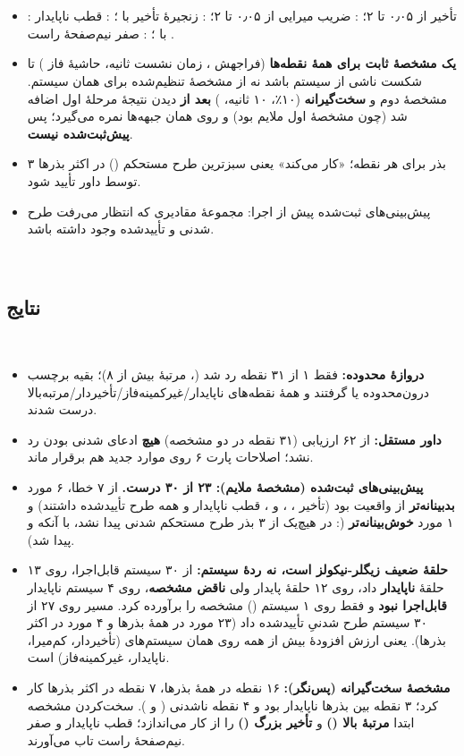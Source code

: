 ‫\documentclass[a4paper,12pt]{article}
\begin{document}
‫\begin{itemize}
‫\item {}: تأخیر \lr{$\theta/\tau$} از ۰٫۰۵ تا ۲؛ : ضریب میرایی \lr{$\zeta$} از ۰٫۰۵ تا ۲؛ : زنجیرهٔ تأخیر  با ؛ : قطب ناپایدار  با ؛ : صفر نیم‌صفحهٔ راست .
‫\item \textbf{یک مشخصهٔ ثابت برای همهٔ نقطه‌ها} (فراجهش ، زمان نشست  ثانیه، حاشیهٔ فاز ) تا شکست ناشی از سیستم باشد نه از مشخصهٔ تنظیم‌شده برای همان سیستم. مشخصهٔ دوم و \textbf{سخت‌گیرانه} (۱۰٪، ۱۰ ثانیه، ) \textbf{بعد از} دیدن نتیجهٔ مرحلهٔ اول اضافه شد (چون مشخصهٔ اول ملایم بود) و روی همان جبهه‌ها نمره می‌گیرد؛ پس \textbf{پیش‌ثبت‌شده نیست}.
‫\item ۳ بذر  برای هر نقطه؛ «کار می‌کند» یعنی سبزترین طرح مستحکم () در اکثر بذرها توسط داور تأیید شود.
‫\item پیش‌بینی‌های ثبت‌شده پیش از اجرا: مجموعهٔ مقادیری که انتظار می‌رفت طرح  شدنی و تأییدشده وجود داشته باشد.
‫\end{itemize}
‫
‫\subsection{نتایج}
‫\begin{itemize}
‫\item \textbf{دروازهٔ محدوده:} فقط ۱ از ۳۱ نقطه رد شد (، مرتبهٔ بیش از ۸)؛ بقیه برچسب درون‌محدوده یا  گرفتند و همهٔ نقطه‌های ناپایدار/غیرکمینه‌فاز/تأخیردار/مرتبه‌بالا درست  شدند.
‫\item \textbf{داور مستقل:} از ۶۲ ارزیابی (۳۱ نقطه در دو مشخصه) \textbf{هیچ} ادعای شدنی بودن رد نشد؛ اصلاحات پارت ۶ روی موارد جدید هم برقرار ماند.
‫\item \textbf{پیش‌بینی‌های ثبت‌شده (مشخصهٔ ملایم): ۲۳ از ۳۰ درست.} از ۷ خطا، ۶ مورد \textbf{بدبینانه‌تر} از واقعیت بود (تأخیر ، ،  و ، قطب ناپایدار  و  همه طرح تأییدشده داشتند) و ۱ مورد \textbf{خوش‌بینانه‌تر} (: در هیچ‌یک از ۳ بذر طرح مستحکم شدنی پیدا نشد، با آنکه  و  پیدا شد).
‫\item \textbf{حلقهٔ ضعیف زیگلر-نیکولز است، نه ردهٔ سیستم:} از ۳۰ سیستم قابل‌اجرا،  روی ۱۳ حلقهٔ \textbf{ناپایدار} داد، روی ۱۲ حلقهٔ پایدار ولی \textbf{ناقض مشخصه}، روی ۴ سیستم ناپایدار \textbf{قابل‌اجرا نبود} و فقط روی ۱ سیستم () مشخصه را برآورده کرد. مسیر  روی ۲۷ از ۳۰ سیستم طرح شدنیِ تأییدشده داد (۲۳ مورد در همهٔ بذرها و ۴ مورد در اکثر بذرها). یعنی ارزش افزودهٔ  بیش از همه روی همان سیستم‌های  (تأخیردار، کم‌میرا، ناپایدار، غیرکمینه‌فاز) است.
‫\item \textbf{مشخصهٔ سخت‌گیرانه (پس‌نگر):} ۱۶ نقطه در همهٔ بذرها، ۷ نقطه در اکثر بذرها کار کرد؛ ۳ نقطه بین بذرها ناپایدار بود و ۴ نقطه ناشدنی ( و ). سخت‌کردن مشخصه ابتدا \textbf{مرتبهٔ بالا ()} و \textbf{تأخیر بزرگ ()} را از کار می‌اندازد؛ قطب ناپایدار و صفر نیم‌صفحهٔ راست  تاب می‌آورند.
‫\end{itemize}
\end{document}
